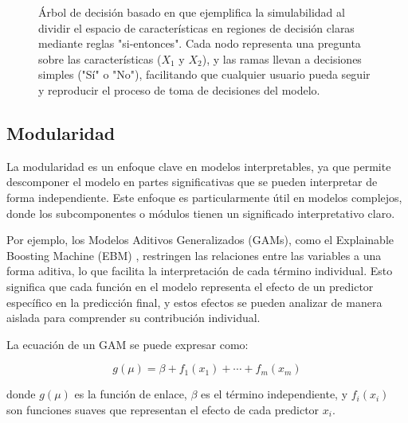 \begin{figure}[h!]
\centering
{}
\caption{Árbol de decisión basado en \cite{murdoch2019interpretable} que ejemplifica la simulabilidad al dividir el espacio de características en regiones de decisión claras mediante reglas "si-entonces". Cada nodo representa una pregunta sobre las características (\(X_1\) y \(X_2\)), y las ramas llevan a decisiones simples ("Sí" o "No"), facilitando que cualquier usuario pueda seguir y reproducir el proceso de toma de decisiones del modelo.}
\label{fig:decision_tree}
\end{figure}

\subsection{Modularidad}

La modularidad es un enfoque clave en modelos interpretables, ya que permite descomponer el modelo en partes significativas que se pueden interpretar de forma independiente. Este enfoque es particularmente útil en modelos complejos, donde los subcomponentes o módulos tienen un significado interpretativo claro. 

Por ejemplo, los Modelos Aditivos Generalizados (GAMs)\cite{hastie2017generalized}, como el Explainable Boosting Machine (EBM) \cite{murdoch2019interpretable}, restringen las relaciones entre las variables a una forma aditiva, lo que facilita la interpretación de cada término individual. Esto significa que cada función en el modelo representa el efecto de un predictor específico en la predicción final, y estos efectos se pueden analizar de manera aislada para comprender su contribución individual.

La ecuación de un GAM se puede expresar como:

\begin{equation}
g(\mu) = \beta + f_1(x_1) + \cdots + f_m(x_m)
\end{equation}

donde \(g(\mu)\) es la función de enlace, \(\beta\) es el término independiente, y \(f_i(x_i)\) son funciones suaves que representan el efecto de cada predictor \(x_i\).

